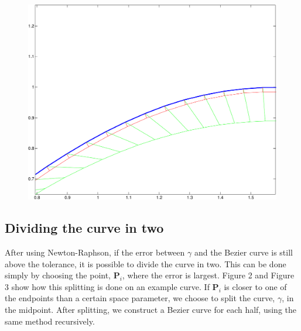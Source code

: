 \documentclass[10pt]{article}
\begin{document}
\begin{figure}
\centering
\begin{minipage}[t]{.4\textwidth}
\centering
\vspace{0pt}
    \includegraphics[scale=0.42, clip=true, trim = 0 0 0.9cm 5.5cm]{newtons3-crop.pdf}
    \label{fig:Newton-Raphson}
\end{minipage}\hfill
\begin{minipage}[t]{.4\textwidth}
\centering
\vspace{0pt}
\end{minipage}
\end{figure}


\subsection*{Dividing the curve in two}
After using Newton-Raphson, if the error between $\gamma$ and the Bezier curve is still above the tolerance, it is possible to divide the curve in two. This can be done simply by choosing the point, $\mathbf{P}_i$, where the error is largest. Figure 2 and Figure 3 show how this splitting is done on an example curve. If $\mathbf{P}_i$ is closer to one of the endpoints than a certain space parameter, we choose to split the curve, $\gamma$, in the midpoint. After splitting, we construct a Bezier curve for each half, using the same method recursively.
\end{document}
